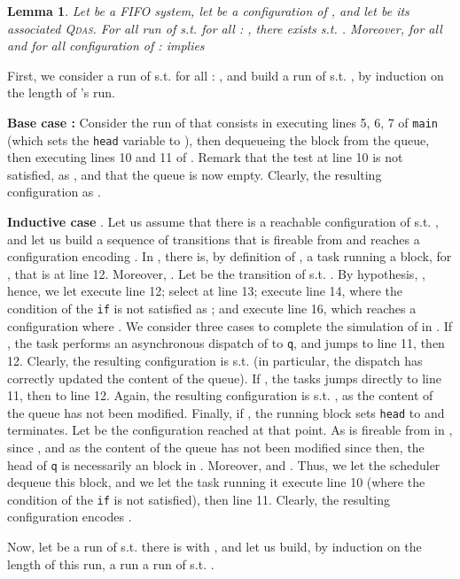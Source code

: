 \documentclass[runningheads,oribibl,]{article}
\newcommand{\qdas}{\textsc{Qdas}\xspace}
\newtheorem{lemma}{Lemma}{}
\newenvironment{proof}{\noindent{\it Proof.\hspace*{.5cm}}}{}
\begin{document}
\begin{lemma}\label{lem:from-fifo-to-qdas}
  Let  be a FIFO system, let  be a configuration of , and let
   be its associated \qdas. For all run
   of  s.t. for all :
  , there exists  s.t.
  . Moreover, for all
   and for all configuration  of
  :  implies 
\end{lemma}
\begin{proof}
  First, we consider a run  of 
  s.t. for all : , and build a run
   of 
  s.t. , by induction on the length
  of 's run.

  \textbf{Base case :} Consider the run of  that consists
  in executing lines 5, 6, 7 of \texttt{main} (which sets the
  \texttt{head} variable to ), then dequeueing the  block from
  the queue, then executing lines 10 and 11 of . Remark that the
  test at line 10 is not satisfied, as , and that
  the queue is now empty. Clearly, the resulting configuration
   as .

  \textbf{Inductive case }. Let us assume that there is a
  reachable configuration  of 
  s.t. , and let us build
  a sequence of  transitions that is fireable from
   and reaches a configuration encoding
  . In , there is, by definition of
  , a task running a  block, for , that is
  at line 12. Moreover, . Let
   be the transition of 
  s.t. . By
  hypothesis, , hence, we let  execute line 12;
  select  at line 13; execute line 14,
  where the condition of the \texttt{if} is not satisfied as
  ; and execute line 16, which reaches a
  configuration  where
  . We consider three cases to complete
  the simulation of  in . If , the  task
  performs an asynchronous dispatch of  to \texttt{q}, and jumps to
  line 11, then 12. Clearly, the resulting configuration
   is s.t. 
  (in particular, the dispatch has correctly updated the content of
  the queue). If , the  tasks jumps directly to line 11, then
  to line 12. Again, the resulting configuration 
  is s.t. , as the content of
  the queue has not been modified. Finally, if , the running 
  block sets \texttt{head} to  and terminates. Let
   be the  configuration reached at that
  point. As  is fireable from  in ,
  since , and as the
  content of the queue has not been modified since then, the head of
  \texttt{q} is necessarily an  block in . Moreover,
   and
  . Thus, we let the scheduler dequeue
  this  block, and we let the task running it execute line 10
  (where the condition of the \texttt{if} is not satisfied), then line
  11. Clearly, the resulting configuration encodes .
  \medskip

  Now, let  be a run of  s.t. there is  with
  , and let us build, by induction on the
  length of this run, a run  a
  run of  s.t. .


\end{proof}
\end{document}
